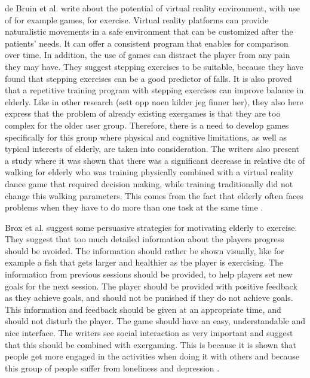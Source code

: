 de Bruin et al. \cite{bruin} write about the potential of virtual reality environment, with use of for example games, for exercise. Virtual reality platforms can provide naturalistic movements in a safe environment that can be customized after the patients' needs. It can offer a consistent program that enables for comparison over time. In addition, the use of games can distract the player from any pain they may have. They suggest stepping exercises to be suitable, because they have found that stepping exercises can be a good predictor of falls. It is also proved that a repetitive training program with stepping exercises can improve balance in elderly. Like in other research (sett opp noen kilder jeg finner her), they also here express that the problem of already existing exergames is that they are too complex for the older user group. Therefore, there is a need to develop games specifically for this group where physical and cognitive limitations, as well as typical interests of elderly, are taken into consideration. The writers also present a study where it was shown that there was a significant decrease in relative \ac{dtc} of walking for elderly who was training physically combined with a virtual reality dance game that required decision making, while training traditionally did not change this walking parameters. This comes from the fact that elderly often faces problems when they have to do more than one task at the same time \cite{bruin}.

Brox et al. \cite{exergamesforelderly} suggest some persuasive strategies for motivating elderly to exercise. They suggest that too much detailed information about the players progress should be avoided. The information should rather be shown visually, like for example a fish that gets larger and healthier as the player is exercising. The information from previous sessions should be provided, to help players set new goals for the next session. The player should be provided with positive feedback as they achieve goals, and should not be punished if they do not achieve goals. This information and feedback should be given at an appropriate time, and should not  disturb the player. The game should have an easy, understandable and nice interface. The writers see social interaction as very important and suggest that this should be combined with exergaming. This is because it is shown that people get more engaged in the activities when doing it with others and because this group of people suffer from loneliness and depression \cite{exergamesforelderly}. 

